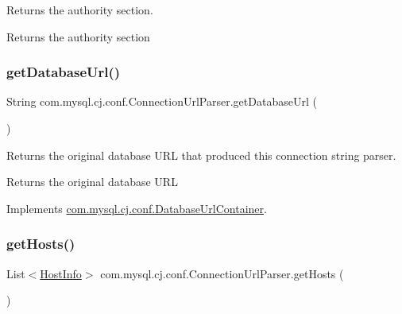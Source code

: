 Returns the authority section.

\begin{DoxyReturn}{Returns}
the authority section 
\end{DoxyReturn}
\mbox{\label{classcom_1_1mysql_1_1cj_1_1conf_1_1_connection_url_parser_af08f3c184e60422f883d7400e326e3e1}} 
\subsubsection{\texorpdfstring{get\+Database\+Url()}{getDatabaseUrl()}}
{\footnotesize\ttfamily String com.\+mysql.\+cj.\+conf.\+Connection\+Url\+Parser.\+get\+Database\+Url (\begin{DoxyParamCaption}{ }\end{DoxyParamCaption})}

Returns the original database U\+RL that produced this connection string parser.

\begin{DoxyReturn}{Returns}
the original database U\+RL 
\end{DoxyReturn}


Implements \mbox{\hyperlink{interfacecom_1_1mysql_1_1cj_1_1conf_1_1_database_url_container_a5a2570fc547da50c4d8f0486de2fb13e}{com.\+mysql.\+cj.\+conf.\+Database\+Url\+Container}}.

\mbox{\label{classcom_1_1mysql_1_1cj_1_1conf_1_1_connection_url_parser_a1e8d19de90145bad47380341900627b0}} 
\subsubsection{\texorpdfstring{get\+Hosts()}{getHosts()}}
{\footnotesize\ttfamily List$<$\mbox{\hyperlink{classcom_1_1mysql_1_1cj_1_1conf_1_1_host_info}{Host\+Info}}$>$ com.\+mysql.\+cj.\+conf.\+Connection\+Url\+Parser.\+get\+Hosts (\begin{DoxyParamCaption}{ }\end{DoxyParamCaption})}

